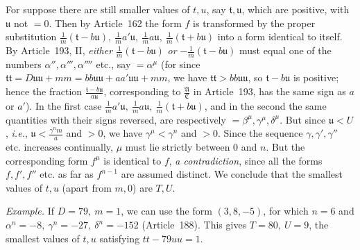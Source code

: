 For suppose there are still smaller values of \(t,u\), say \(\mathfrak{t},\mathfrak{u}\), which are positive, with \(\mathfrak{u}\) not \(=0\). Then by Article~162 the form \(f\) is transformed by the proper substitution \(\frac1m(\mathfrak{t}-b\mathfrak{u}),\ \frac1m a'\mathfrak{u},\ \frac1m a\mathfrak{u},\ \frac1m(\mathfrak{t}+b\mathfrak{u})\) into a form identical to
itself. By Article~193, II, \textit{either} \(\frac1m(\mathfrak{t}-b\mathfrak{u})\) \textit{or} \(-\frac1m(\mathfrak{t}-b\mathfrak{u})\) must equal one of the numbers \(\alpha'',\alpha''',\alpha''''\) etc., say \(=\alpha^\mu\) (for since \(\mathfrak{tt}=D\mathfrak{uu}+mm=bb\mathfrak{uu}+aa'\mathfrak{uu}+mm\), we have \(\mathfrak{tt}>bb\mathfrak{uu}\), so \(\mathfrak{t}-b\mathfrak{u}\) is positive; hence the fraction \(\frac{\mathfrak{t}-b\mathfrak{u}}{a\mathfrak{u}}\), corresponding to \(\frac{\mathfrak{A}}{\mathfrak{C}}\) in Article~193, has the same sign as \(a\) or \(a'\)). In the first case \(\frac1m a'\mathfrak{u},\ \frac1m a\mathfrak{u},\ \frac1m(\mathfrak{t}+b\mathfrak{u})\), and in the second the same quantities with their signs reversed, are respectively \(=\beta^\mu,\gamma^\mu,\delta^\mu\). But since \(\mathfrak{u}<U\), \textit{i.e.}, \(\mathfrak{u}<\frac{\gamma^n m}{a}\) and \(>0\), we have \(\gamma^\mu<\gamma^n\) and \(>0\). Since the sequence \(\gamma,\gamma',\gamma''\) etc. increases continually, \(\mu\) must lie strictly between \(0\) and \(n\). But the corresponding form \(f^\mu\) is identical to \(f\), \textit{a contradiction}, since all the forms \(f,f',f''\) etc. as far as \(f^{n-1}\) are assumed distinct. We conclude that the smallest values of \(t,u\) (apart from \(m,0\)) are \(T,U\).

\textit{Example.} If \(D=79,\ m=1\), we can use the form \((3,8,-5)\), for which \(n=6\) and \(\alpha^n=-8,\ \gamma^n=-27,\ \delta^n=-152\) (Article~188). This gives \(T=80,\ U=9\), the smallest values of \(t,u\) satisfying \(tt-79uu=1\).

